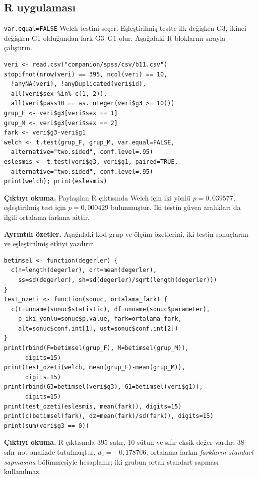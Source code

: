 \par\noindent\begin{minipage}{\linewidth}
\subsection{R uygulaması}
\label{sec:r-gercek-b11}

\texttt{var.equal=FALSE} Welch testini seçer. Eşleştirilmiş testte
ilk değişken G3, ikinci değişken G1 olduğundan fark G3--G1 olur.
Aşağıdaki R bloklarını sırayla çalıştırın.

\begin{lstlisting}[style=prismR]
veri <- read.csv("companion/spss/csv/b11.csv")
stopifnot(nrow(veri) == 395, ncol(veri) == 10,
  !anyNA(veri), !anyDuplicated(veri$id),
  all(veri$sex %in% c(1, 2)),
  all(veri$pass10 == as.integer(veri$g3 >= 10)))
grup_F <- veri$g3[veri$sex == 1]
grup_M <- veri$g3[veri$sex == 2]
fark <- veri$g3-veri$g1
welch <- t.test(grup_F, grup_M, var.equal=FALSE,
  alternative="two.sided", conf.level=.95)
eslesmis <- t.test(veri$g3, veri$g1, paired=TRUE,
  alternative="two.sided", conf.level=.95)
print(welch); print(eslesmis)
\end{lstlisting}

\textbf{Çıktıyı okuma.} Paylaşılan R çıktısında Welch için iki yönlü
$p=0{,}039577$, eşleştirilmiş test için $p=0{,}000429$ bulunmuştur.
İki testin güven aralıkları da ilgili ortalama farkına aittir.
\end{minipage}\par

\par\noindent\begin{minipage}{\linewidth}
\textbf{Ayrıntılı özetler.} Aşağıdaki kod grup ve ölçüm özetlerini,
iki testin sonuçlarını ve eşleştirilmiş etkiyi yazdırır.

\begin{lstlisting}[style=prismR]
betimsel <- function(degerler) {
  c(n=length(degerler), ort=mean(degerler),
    ss=sd(degerler), sh=sd(degerler)/sqrt(length(degerler)))
}
test_ozeti <- function(sonuc, ortalama_fark) {
  c(t=unname(sonuc$statistic), df=unname(sonuc$parameter),
    p_iki_yonlu=sonuc$p.value, fark=ortalama_fark,
    alt=sonuc$conf.int[1], ust=sonuc$conf.int[2])
}
print(rbind(F=betimsel(grup_F), M=betimsel(grup_M)),
      digits=15)
print(test_ozeti(welch, mean(grup_F)-mean(grup_M)),
      digits=15)
print(rbind(G3=betimsel(veri$g3), G1=betimsel(veri$g1)),
      digits=15)
print(test_ozeti(eslesmis, mean(fark)), digits=15)
print(c(betimsel(fark), dz=mean(fark)/sd(fark)), digits=15)
print(sum(veri$g3 == 0))
\end{lstlisting}

\textbf{Çıktıyı okuma.} R çıktısında 395 satır, 10 sütun ve sıfır
eksik değer vardır; 38 sıfır not analizde tutulmuştur.
$d_z=-0{,}178706$, ortalama farkın \emph{farkların standart sapmasına}
bölünmesiyle hesaplanır; iki grubun ortak standart sapması kullanılmaz.
\end{minipage}\par

